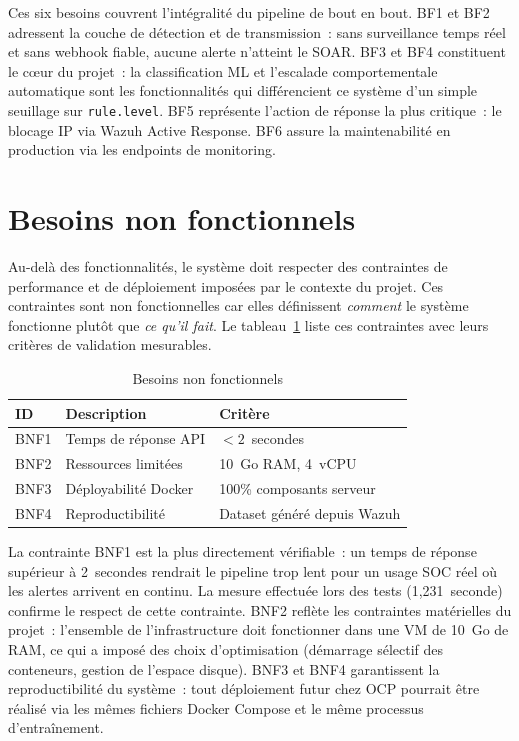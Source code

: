 \documentclass[12pt,a4paper]{report}
\begin{document}
Ces six besoins couvrent l'intégralité du pipeline de bout en bout. BF1 et BF2 adressent la couche de détection et de transmission~: sans surveillance temps réel et sans webhook fiable, aucune alerte n'atteint le SOAR. BF3 et BF4 constituent le cœur du projet~: la classification ML et l'escalade comportementale automatique sont les fonctionnalités qui différencient ce système d'un simple seuillage sur \texttt{rule.level}. BF5 représente l'action de réponse la plus critique~: le blocage IP via Wazuh Active Response. BF6 assure la maintenabilité en production via les endpoints de monitoring.

\section{Besoins non fonctionnels}

Au-delà des fonctionnalités, le système doit respecter des contraintes de performance et de déploiement imposées par le contexte du projet. Ces contraintes sont non fonctionnelles car elles définissent \textit{comment} le système fonctionne plutôt que \textit{ce qu'il fait}. Le tableau~\ref{tab:bnf} liste ces contraintes avec leurs critères de validation mesurables.

\begin{table}[H]
\centering
\caption{Besoins non fonctionnels}
\label{tab:bnf}
\begin{tabular}{|l|p{7cm}|l|}
\hline
\rowcolor{ColSection!15}
\textbf{ID} & \textbf{Description} & \textbf{Critère} \\
\hline
BNF1 & Temps de réponse API & $< 2$~secondes \\
BNF2 & Ressources limitées & 10~Go RAM, 4~vCPU \\
BNF3 & Déployabilité Docker & 100\% composants serveur \\
BNF4 & Reproductibilité & Dataset généré depuis Wazuh \\
\hline
\end{tabular}
\end{table}

La contrainte BNF1 est la plus directement vérifiable~: un temps de réponse supérieur à 2~secondes rendrait le pipeline trop lent pour un usage SOC réel où les alertes arrivent en continu. La mesure effectuée lors des tests (1,231~seconde) confirme le respect de cette contrainte. BNF2 reflète les contraintes matérielles du projet~: l'ensemble de l'infrastructure doit fonctionner dans une VM de 10~Go de RAM, ce qui a imposé des choix d'optimisation (démarrage sélectif des conteneurs, gestion de l'espace disque). BNF3 et BNF4 garantissent la reproductibilité du système~: tout déploiement futur chez OCP pourrait être réalisé via les mêmes fichiers Docker Compose et le même processus d'entraînement.
\end{document}
